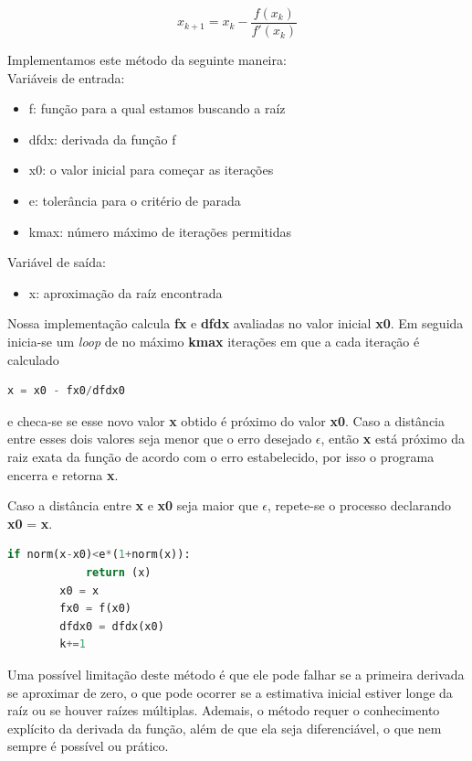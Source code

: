 \documentclass{article}
\begin{document}
\begin{equation}
    x_{k+1} = x_k - \frac{f(x_k)}{f'(x_k)}
    \label{newton}
\end{equation}

Implementamos este m\'{e}todo da seguinte maneira:
\\

Vari\'{a}veis de entrada:
\begin{itemize}
    \item f: fun\c{c}\~{a}o para a qual estamos buscando a ra\'{i}z
    \item dfdx: derivada da fun\c{c}\~{a}o f
    \item x0:  o valor inicial para começar as iterações
    \item e: toler\^{a}ncia para o crit\'{e}rio de parada
    \item kmax: n\'{u}mero m\'{a}ximo de itera\c{c}\~{o}es permitidas
\end{itemize}

Vari\'{a}vel de sa\'{i}da:
\begin{itemize}
    \item x: aproxima\c{c}\~{a}o da ra\'{i}z encontrada
\end{itemize}

Nossa implementa\c{c}\~{a}o calcula \textbf{fx} e \textbf{dfdx} avaliadas no valor inicial \textbf{x0}. Em seguida inicia-se um \textit{loop} de no máximo \textbf{kmax} iterações em que a cada iteração é calculado

\begin{lstlisting}[language=Python]
    x = x0 - fx0/dfdx0
\end{lstlisting}
e checa-se se esse novo valor \textbf{x} obtido é próximo do valor \textbf{x0}. Caso a distância entre esses dois valores seja menor que o erro desejado $\epsilon$, então \textbf{x} está próximo da raiz exata da função de acordo com o erro estabelecido, por isso o programa encerra e retorna \textbf{x}.

Caso a distância entre \textbf{x} e \textbf{x0} seja maior que $\epsilon$, repete-se o processo declarando \textbf{x0} = \textbf{x}.

\begin{lstlisting}[language=Python]
    if norm(x-x0)<e*(1+norm(x)):
            return (x)
        x0 = x
        fx0 = f(x0)
        dfdx0 = dfdx(x0)
        k+=1
\end{lstlisting}



Uma poss\'{i}vel limita\c{c}\~{a}o deste m\'{e}todo \'{e} que ele pode falhar se a primeira derivada se aproximar de zero, o que pode ocorrer se a estimativa inicial estiver longe da ra\'{i}z ou se houver ra\'{i}zes m\'{u}ltiplas. Ademais, o m\'{e}todo requer o conhecimento expl\'{i}cito da derivada da fun\c{c}\~{a}o, além de que ela seja diferenciável, o que nem sempre \'{e} poss\'{i}vel ou pr\'{a}tico.
\end{document}
